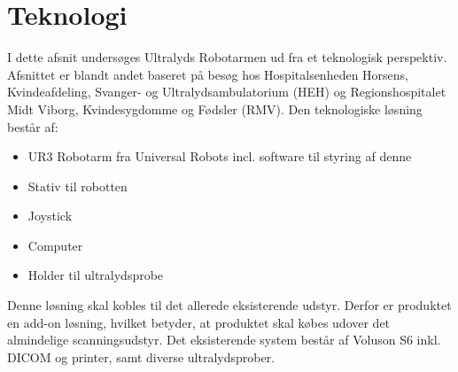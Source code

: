 \chapter{Teknologi} \label{Teknologi}
I dette afsnit undersøges Ultralyds Robotarmen ud fra et teknologisk perspektiv. Afsnittet er blandt andet baseret på besøg hos Hospitalsenheden Horsens, Kvindeafdeling, Svanger- og Ultralydsambulatorium (HEH) og Regionshospitalet Midt Viborg, Kvindesygdomme og Fødsler (RMV). Den teknologiske løsning består af:
\begin{itemize}
\item UR3 Robotarm fra Universal Robots incl. software til styring af denne
\item Stativ til robotten
\item Joystick
\item Computer
\item Holder til ultralydsprobe
\end{itemize}
Denne løsning skal kobles til det allerede eksisterende udstyr. Derfor er produktet en add-on løsning, hvilket betyder, at produktet skal købes udover det almindelige scanningsudstyr. Det eksisterende system består af Voluson S6 inkl. DICOM og printer, samt diverse ultralydsprober.  

